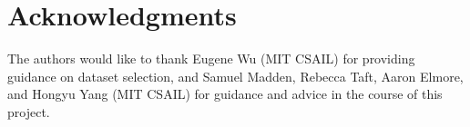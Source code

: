 \section{Acknowledgments}
The authors would like to thank Eugene Wu (MIT CSAIL) for providing guidance on dataset selection, and Samuel Madden, Rebecca Taft, Aaron Elmore, and Hongyu Yang (MIT CSAIL) for guidance and advice in the course of this project.
